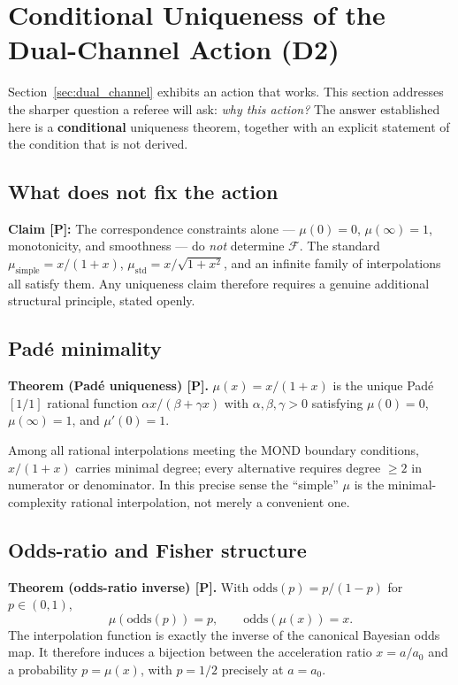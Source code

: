 \documentclass[aps,prd,preprint,superscriptaddress,nofootinbib,amsmath,amssymb,floatfix]{revtex4-2}
\begin{document}
\section{Conditional Uniqueness of the Dual-Channel Action (D2)}
\label{sec:uniqueness}

Section~\ref{sec:dual_channel} exhibits an action that works. This section addresses the sharper question a referee will ask: \emph{why this action?} The answer established here is a \textbf{conditional} uniqueness theorem, together with an explicit statement of the condition that is not derived.

\subsection{What does not fix the action}

\textbf{Claim [P]:} The correspondence constraints alone --- $\mu(0)=0$, $\mu(\infty)=1$, monotonicity, and smoothness --- do \emph{not} determine $\mathcal{F}$. The standard $\mu_{\text{simple}} = x/(1+x)$, $\mu_{\text{std}} = x/\sqrt{1+x^2}$, and an infinite family of interpolations all satisfy them. Any uniqueness claim therefore requires a genuine additional structural principle, stated openly.

\subsection{Pad\'e minimality}

\textbf{Theorem (Pad\'e uniqueness) [P].} $\mu(x) = x/(1+x)$ is the unique Pad\'e $[1/1]$ rational function $\alpha x/(\beta + \gamma x)$ with $\alpha,\beta,\gamma>0$ satisfying $\mu(0)=0$, $\mu(\infty)=1$, and $\mu'(0)=1$.

Among all rational interpolations meeting the MOND boundary conditions, $x/(1+x)$ carries minimal degree; every alternative requires degree $\ge 2$ in numerator or denominator. In this precise sense the ``simple'' $\mu$ is the minimal-complexity rational interpolation, not merely a convenient one.

\subsection{Odds-ratio and Fisher structure}

\textbf{Theorem (odds-ratio inverse) [P].} With $\text{odds}(p) = p/(1-p)$ for $p\in(0,1)$,
\begin{equation}
\mu(\text{odds}(p)) = p, \qquad \text{odds}(\mu(x)) = x .
\end{equation}
The interpolation function is exactly the inverse of the canonical Bayesian odds map. It therefore induces a bijection between the acceleration ratio $x = a/a_0$ and a probability $p = \mu(x)$, with $p = 1/2$ precisely at $a = a_0$.
\end{document}
